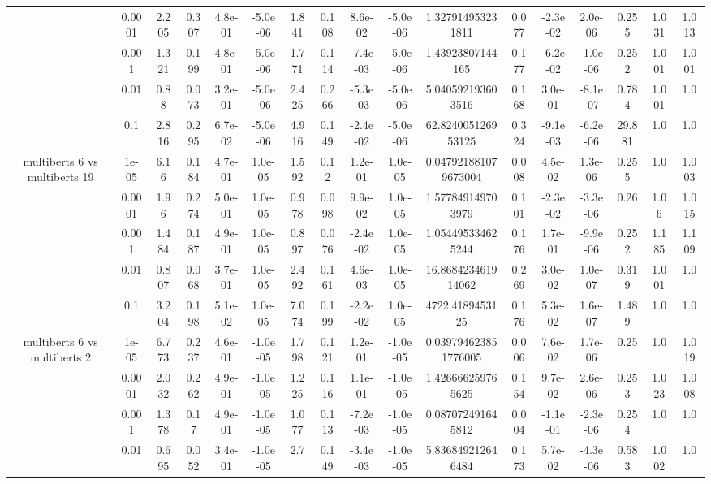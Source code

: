\begin{tabular}{|c|c|c|c|c|c|c|c|c|c|c|c|c|c|c|c|c|}
 & 0.0001 & 2.205 & 0.307 & 4.8e-01 & -5.0e-06 & 1.841 & 0.108 & 8.6e-02 & -5.0e-06 & 1.327914953231811 & 0.077 & -2.3e-02 & 2.0e-06 & 0.255 & 1.031 & 1.013 \\
 & 0.001 & 1.321 & 0.199 & 4.8e-01 & -5.0e-06 & 1.771 & 0.114 & -7.4e-03 & -5.0e-06 & 1.43923807144165 & 0.177 & -6.2e-02 & -1.0e-06 & 0.252 & 1.001 & 1.001 \\
 & 0.01 & 0.88 & 0.073 & 3.2e-01 & -5.0e-06 & 2.425 & 0.266 & -5.3e-03 & -5.0e-06 & 5.040592193603516 & 0.168 & 3.0e-01 & -8.1e-07 & 0.784 & 1.001 & 1.0 \\
 & 0.1 & 2.816 & 0.295 & 6.7e-02 & -5.0e-06 & 4.916 & 0.149 & -2.4e-02 & -5.0e-06 & 62.824005126953125 & 0.324 & -9.1e-03 & -6.2e-06 & 29.881 & 1.0 & 1.0 \\
\hline
\multirow{5}{*}{multiberts 6 vs multiberts 19} & 1e-05 & 6.16 & 0.184 & 4.7e-01 & 1.0e-05 & 1.592 & 0.12 & 1.2e-01 & 1.0e-05 & 0.047921881079673004 & 0.008 & 4.5e-02 & 1.3e-06 & 0.255 & 1.0 & 1.003 \\
 & 0.0001 & 1.96 & 0.274 & 5.0e-01 & 1.0e-05 & 0.978 & 0.098 & 9.9e-02 & 1.0e-05 & 1.577849149703979 & 0.101 & -2.3e-02 & -3.3e-06 & 0.26 & 1.06 & 1.015 \\
 & 0.001 & 1.484 & 0.187 & 4.9e-01 & 1.0e-05 & 0.897 & 0.076 & -2.4e-02 & 1.0e-05 & 1.054495334625244 & 0.176 & 1.7e-01 & -9.9e-06 & 0.252 & 1.185 & 1.109 \\
 & 0.01 & 0.807 & 0.068 & 3.7e-01 & 1.0e-05 & 2.492 & 0.161 & 4.6e-03 & 1.0e-05 & 16.868423461914062 & 0.269 & 3.0e-02 & 1.0e-07 & 0.319 & 1.001 & 1.0 \\
 & 0.1 & 3.204 & 0.198 & 5.1e-02 & 1.0e-05 & 7.074 & 0.199 & -2.2e-02 & 1.0e-05 & 4722.4189453125 & 0.176 & 5.3e-02 & 1.6e-07 & 1.489 & 1.0 & 1.0 \\
\hline
\multirow{5}{*}{multiberts 6 vs multiberts 2} & 1e-05 & 6.773 & 0.237 & 4.6e-01 & -1.0e-05 & 1.798 & 0.121 & 1.2e-01 & -1.0e-05 & 0.039794623851776005 & 0.006 & 7.6e-02 & 1.7e-06 & 0.25 & 1.0 & 1.019 \\
 & 0.0001 & 2.032 & 0.262 & 4.9e-01 & -1.0e-05 & 1.225 & 0.116 & 1.1e-01 & -1.0e-05 & 1.426666259765625 & 0.154 & 9.7e-02 & 2.6e-06 & 0.253 & 1.023 & 1.008 \\
 & 0.001 & 1.378 & 0.17 & 4.9e-01 & -1.0e-05 & 1.077 & 0.113 & -7.2e-03 & -1.0e-05 & 0.087072491645812 & 0.004 & -1.1e-01 & -2.3e-06 & 0.254 & 1.0 & 1.0 \\
 & 0.01 & 0.695 & 0.052 & 3.4e-01 & -1.0e-05 & 2.7 & 0.149 & -3.4e-03 & -1.0e-05 & 5.836849212646484 & 0.173 & 5.7e-02 & -4.3e-06 & 0.583 & 1.002 & 1.0 \\

\end{tabular}
